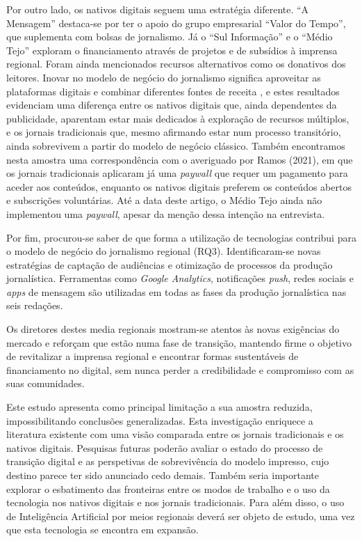 \documentclass[portuguese]{textolivre}
\begin{document}
Por outro lado, os nativos digitais seguem uma estratégia diferente. ``A
Mensagem'' destaca-se por ter o apoio do grupo empresarial ``Valor do
Tempo'', que suplementa com bolsas de jornalismo. Já o ``Sul
Informação'' e o ``Médio Tejo'' exploram o financiamento através de
projetos e de subsídios à imprensa regional. Foram ainda mencionados
recursos alternativos como os donativos dos leitores. Inovar no modelo
de negócio do jornalismo significa aproveitar as plataformas digitais e
combinar diferentes fontes de receita \cite{canavilhas2015nuevos}, e estes
resultados evidenciam uma diferença entre os nativos digitais que, ainda
dependentes da publicidade, aparentam estar mais dedicados à exploração
de recursos múltiplos, e os jornais tradicionais que, mesmo afirmando
estar num processo transitório, ainda sobrevivem a partir do modelo de
negócio clássico. Também encontramos nesta amostra uma correspondência
com o averiguado por Ramos (2021), em que os jornais tradicionais
aplicaram já uma \emph{paywall} que requer um pagamento para aceder aos
conteúdos, enquanto os nativos digitais preferem os conteúdos abertos e
subscrições voluntárias. Até a data deste artigo, o Médio Tejo ainda não
implementou uma \emph{paywall}, apesar da menção dessa intenção na
entrevista.

Por fim, procurou-se saber de que forma a utilização de tecnologias
contribui para o modelo de negócio do jornalismo regional (RQ3).
Identificaram-se novas estratégias de captação de audiências e
otimização de processos da produção jornalística. Ferramentas como
\emph{Google Analytics}, notificações \emph{push}, redes sociais e
\emph{apps} de mensagem são utilizadas em todas as fases da produção
jornalística nas seis redações.

Os diretores destes media regionais mostram-se atentos às novas
exigências do mercado e reforçam que estão numa fase de transição,
mantendo firme o objetivo de revitalizar a imprensa regional e encontrar
formas sustentáveis de financiamento no digital, sem nunca perder a
credibilidade e compromisso com as suas comunidades.

Este estudo apresenta como principal limitação a sua amostra reduzida,
impossibilitando conclusões generalizadas. Esta investigação enriquece a
literatura existente com uma visão comparada entre os jornais
tradicionais e os nativos digitais. Pesquisas futuras poderão avaliar o
estado do processo de transição digital e as perspetivas de
sobrevivência do modelo impresso, cujo destino parece ter sido anunciado
cedo demais. Também seria importante explorar o esbatimento das
fronteiras entre os modos de trabalho e o uso da tecnologia nos nativos
digitais e nos jornais tradicionais. Para além disso, o uso de
Inteligência Artificial por meios regionais deverá ser objeto de estudo,
uma vez que esta tecnologia se encontra em expansão.
\end{document}
